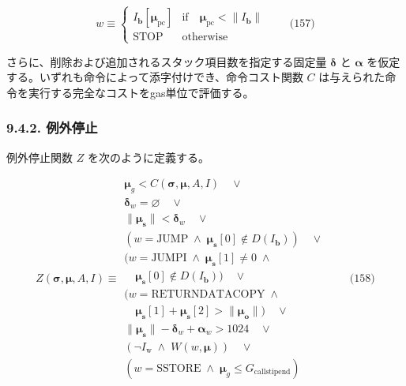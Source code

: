 \documentclass[
]{ltjsarticle}
\begin{document}
\[w \equiv \begin{cases} I_{\mathbf{b}}[\boldsymbol{\mu}_{\mathrm{pc}}] & \text{if} \quad \boldsymbol{\mu}_{\mathrm{pc}} < \lVert I_{\mathbf{b}} \rVert \\
\text{STOP} & \text{otherwise}
\end{cases} \qquad \text{(157)}\]

さらに、削除および追加されるスタック項目数を指定する固定量
\(\mathbf{\delta}\) と \(\mathbf{\alpha}\)
を仮定する。いずれも命令によって添字付けでき、命令コスト関数 \(C\)
は与えられた命令を実行する完全なコストをgas単位で評価する。

\protect\hypertarget{zhalt}{}{}

\hypertarget{ux4f8bux5916ux505cux6b62}{%
\subsubsection{9.4.2. 例外停止}\label{ux4f8bux5916ux505cux6b62}}

\hypertarget{Exceptional_Halting_function_Z}{}

例外停止関数 \(Z\) を次のように定義する。

\protect\hypertarget{eq-158}{}{}

\[Z(\boldsymbol{\sigma}, \boldsymbol{\mu}, A, I) \equiv
\begin{array}{l}
\boldsymbol{\mu}_g < C(\boldsymbol{\sigma}, \boldsymbol{\mu}, A, I) \quad \vee \\
\mathbf{\delta}_w = \varnothing \quad \vee \\
\lVert\boldsymbol{\mu}_\mathbf{s}\rVert < \mathbf{\delta}_w \quad \vee \\
( w = \text{JUMP} \; \wedge \; \boldsymbol{\mu}_\mathbf{s}[0] \notin D(I_\mathbf{b}) ) \quad \vee \\
( w = \text{JUMPI} \; \wedge \; \boldsymbol{\mu}_\mathbf{s}[1] \neq 0 \; \wedge \\
\quad \boldsymbol{\mu}_\mathbf{s}[0] \notin D(I_\mathbf{b}) ) \quad \vee \\
( w = \text{RETURNDATACOPY} \; \wedge \\ \quad \boldsymbol{\mu}_{\mathbf{s}}[1] + \boldsymbol{\mu}_{\mathbf{s}}[2] > \lVert\boldsymbol{\mu}_{\mathbf{o}}\rVert) \quad \vee \\
\lVert\boldsymbol{\mu}_\mathbf{s}\rVert - \mathbf{\delta}_w + \mathbf{\alpha}_w > 1024 \quad \vee \\
( \neg I_{\mathrm{w}} \; \wedge \; W(w, \boldsymbol{\mu}) ) \quad \vee \\
( w = \text{SSTORE} \; \wedge \; \boldsymbol{\mu}_g \leqslant G_{\mathrm{callstipend}} )
\end{array} \qquad \text{(158)}\]
\end{document}
